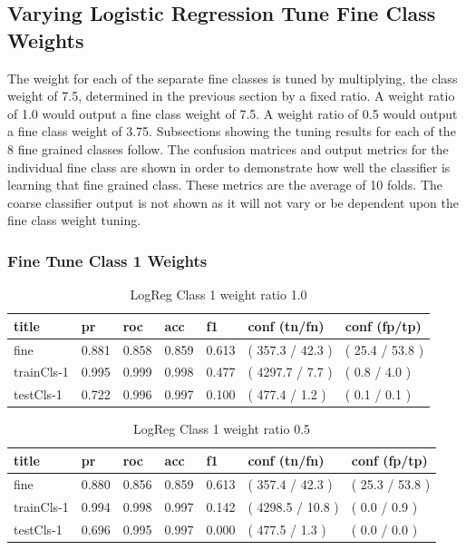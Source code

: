\documentclass[ms]{nuthesis}
\begin{document}
\subsection{Varying Logistic Regression Tune Fine Class Weights}
\par The weight for each of the separate fine classes is tuned by multiplying,
the class weight of 7.5, determined in the previous section by a fixed ratio. A
weight ratio of 1.0 would output a fine class weight of 7.5. A weight ratio of
 0.5 would output a fine class weight of 3.75. Subsections showing the tuning results
 for each of the 8 fine grained classes follow. The confusion matrices and output metrics for the individual
 fine class are shown in order to demonstrate how well the classifier is learning that
 fine grained class. These metrics are the average of 10 folds. The coarse classifier output
 is not shown as it will not vary or be dependent upon the fine class weight tuning.

\subsubsection{Fine Tune Class 1 Weights}
\FloatBarrier
\begin{table}[H]
\centering
\begin{tabular}{|l||l||l||l||l||l||l|}\toprule
title & pr & roc & acc & f1 & conf (tn/fn) & conf (fp/tp) \\ \midrule
fine & 0.881 & 0.858 & 0.859 & 0.613 & ( 357.3 / 42.3 ) & ( 25.4 / 53.8 ) \\
trainCls-1 & 0.995 & 0.999 & 0.998 & 0.477 & ( 4297.7 / 7.7 ) & ( 0.8 / 4.0 ) \\
testCls-1 & 0.722 & 0.996 & 0.997 & 0.100 & ( 477.4 / 1.2 ) & ( 0.1 / 0.1 ) \\ \bottomrule
\end{tabular}
\caption{LogReg Class 1 weight ratio 1.0}
\label{tab:LogRegCls1-Wt1}
\end{table}
\FloatBarrier


\FloatBarrier
\begin{table}[H]
\centering
\begin{tabular}{|l||l||l||l||l||l||l|}\toprule
title & pr & roc & acc & f1 & conf (tn/fn) & conf (fp/tp) \\ \midrule
fine & 0.880 & 0.856 & 0.859 & 0.613 & ( 357.4 / 42.3 ) & ( 25.3 / 53.8 ) \\
trainCls-1 & 0.994 & 0.998 & 0.997 & 0.142 & ( 4298.5 / 10.8 ) & ( 0.0 / 0.9 ) \\
testCls-1 & 0.696 & 0.995 & 0.997 & 0.000 & ( 477.5 / 1.3 ) & ( 0.0 / 0.0 ) \\ \bottomrule
\end{tabular}
\caption{LogReg Class 1 weight ratio 0.5}
\label{tab:LogRegCls1-Wtp5}
\end{table}
\FloatBarrier
\end{document}
